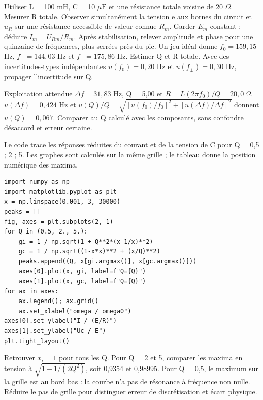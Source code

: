 Utiliser L = 100 mH, C = 10 $\mu\mathrm F$ et une résistance totale voisine de 20 $\Omega$. Mesurer R totale. Observer simultanément la tension e aux bornes du circuit et $u_R$ sur une résistance accessible de valeur connue $R_m$. Garder $E_m$ constant ; déduire $I_m=U_{Rm}/R_m$. Après stabilisation, relever amplitude et phase pour une quinzaine de fréquences, plus serrées près du pic.
Un jeu idéal donne $f_0=159{,}15$ Hz, $f_-=144{,}03$ Hz et $f_+=175{,}86$ Hz. Estimer Q et R totale. Avec des incertitudes-types indépendantes $u(f_0)=0{,}20$ Hz et $u(f_\pm)=0{,}30$ Hz, propager l’incertitude sur Q.
\begin{methode}{Exploitation attendue}
$\Delta f=31{,}83$ Hz, Q = 5,00 et $R=L(2\pi f_0)/Q=20{,}0\ \Omega$. $u(\Delta f)=0{,}424$ Hz et $u(Q)/Q=\sqrt{[u(f_0)/f_0]^2+[u(\Delta f)/\Delta f]^2}$ donnent $u(Q)=0{,}067$. Comparer au Q calculé avec les composants, sans confondre désaccord et erreur certaine.
\end{methode}


Le code trace les réponses réduites du courant et de la tension de C pour Q = 0,5 ; 2 ; 5. Les graphes sont calculés sur la même grille ; le tableau donne la position numérique des maxima.
\begin{verbatim}
import numpy as np
import matplotlib.pyplot as plt
x = np.linspace(0.001, 3, 30000)
peaks = []
fig, axes = plt.subplots(2, 1)
for Q in (0.5, 2., 5.):
    gi = 1 / np.sqrt(1 + Q**2*(x-1/x)**2)
    gc = 1 / np.sqrt((1-x*x)**2 + (x/Q)**2)
    peaks.append((Q, x[gi.argmax()], x[gc.argmax()]))
    axes[0].plot(x, gi, label=f"Q={Q}")
    axes[1].plot(x, gc, label=f"Q={Q}")
for ax in axes:
    ax.legend(); ax.grid()
    ax.set_xlabel("omega / omega0")
axes[0].set_ylabel("I / (E/R)")
axes[1].set_ylabel("Uc / E")
plt.tight_layout()
\end{verbatim}
Retrouver $x_i=1$ pour tous les Q. Pour Q = 2 et 5, comparer les maxima en tension à $\sqrt{1-1/(2Q^2)}$, soit 0,9354 et 0,98995. Pour Q = 0,5, le maximum sur la grille est au bord bas : la courbe n’a pas de résonance à fréquence non nulle. Réduire le pas de grille pour distinguer erreur de discrétisation et écart physique.


